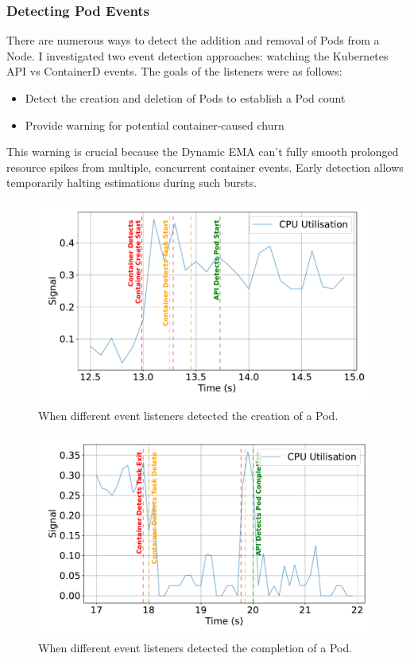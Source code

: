 \subsubsection{Detecting Pod Events}
\label{sec:listeners-comparison}
There are numerous ways to detect the addition and removal of Pods from a Node.
I investigated two event detection approaches: watching the Kubernetes API vs
ContainerD events. The goals of the listeners were as follows:
\begin{itemize}
    \item Detect the creation and deletion of Pods to establish a Pod count
    \item Provide warning for potential container-caused churn
\end{itemize}
This warning is crucial because the Dynamic EMA can't fully smooth prolonged
resource spikes from multiple, concurrent container events. Early detection
allows temporarily halting estimations during such bursts.
\begin{figure}[H]
    \centering
    \includegraphics[width=\textwidth]{images/event-comparison-start.pdf}
    \caption{When different event listeners detected the creation of a Pod.}
    \label{fig:event-evaluation-start}
\end{figure}

\begin{figure}[H]
    \centering
    \includegraphics[width=\textwidth]{images/event-comparison-end.pdf}
    \caption{When different event listeners detected the completion of a Pod.}
    \label{fig:event-evaluation-end}
\end{figure}

